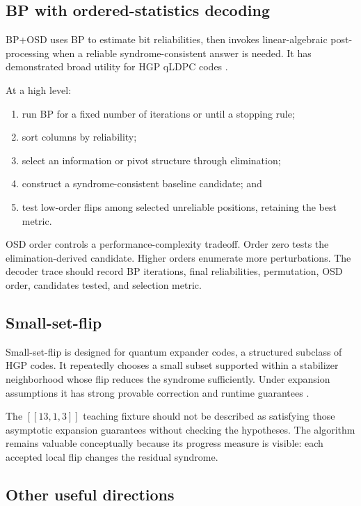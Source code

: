 \documentclass[11pt,letterpaper]{article}
\begin{document}
\subsection{BP with ordered-statistics decoding}

BP+OSD uses BP to estimate bit reliabilities, then invokes linear-algebraic post-processing when a
reliable syndrome-consistent answer is needed. It has demonstrated broad utility for HGP qLDPC
codes \cite{roffe-bposd}.

At a high level:
\begin{enumerate}
  \item run BP for a fixed number of iterations or until a stopping rule;
  \item sort columns by reliability;
  \item select an information or pivot structure through elimination;
  \item construct a syndrome-consistent baseline candidate; and
  \item test low-order flips among selected unreliable positions, retaining the best metric.
\end{enumerate}

OSD order controls a performance-complexity tradeoff. Order zero tests the elimination-derived
candidate. Higher orders enumerate more perturbations. The decoder trace should record BP
iterations, final reliabilities, permutation, OSD order, candidates tested, and selection metric.

\subsection{Small-set-flip}

Small-set-flip is designed for quantum expander codes, a structured subclass of HGP codes. It
repeatedly chooses a small subset supported within a stabilizer neighborhood whose flip reduces
the syndrome sufficiently. Under expansion assumptions it has strong provable correction and
runtime guarantees \cite{leverrier-expander}.

The $[[13,1,3]]$ teaching fixture should not be described as satisfying those asymptotic expansion
guarantees without checking the hypotheses. The algorithm remains valuable conceptually because
its progress measure is visible: each accepted local flip changes the residual syndrome.

\subsection{Other useful directions}
\end{document}
